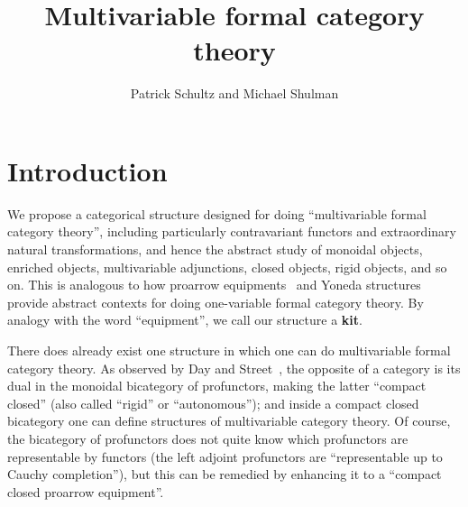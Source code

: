\documentclass{amsart}
\title{Multivariable formal category theory}
\author{Patrick Schultz and Michael Shulman}
\begin{document}
\maketitle

\setcounter{tocdepth}{1}
\tableofcontents

\section{Introduction}
\label{sec:intro}

We propose a categorical structure designed for doing ``multivariable formal category theory'', including particularly contravariant functors and extraordinary natural transformations, and hence the abstract study of monoidal objects, enriched objects, multivariable adjunctions, closed objects, rigid objects, and so on.
This is analogous to how proarrow equipments~\cite{wood:proarrows-i} and Yoneda structures~\cite{street-walters:yoneda} provide abstract contexts for doing one-variable formal category theory.
By analogy with the word ``equipment'', we call our structure a \textbf{kit}.

There does already exist one structure in which one can do multivariable formal category theory.
As observed by Day and Street~\cite{ds:monbi-hopfagbd}, the opposite of a category is its dual in the monoidal bicategory of profunctors, making the latter ``compact closed'' (also called ``rigid'' or ``autonomous''); and inside a compact closed bicategory one can define structures of multivariable category theory.
Of course, the bicategory of profunctors does not quite know which profunctors are representable by functors (the left adjoint profunctors are ``representable up to Cauchy completion''), but this can be remedied by enhancing it to a ``compact closed proarrow equipment''.
\end{document}
